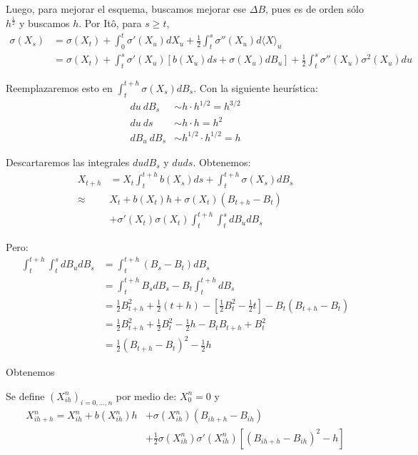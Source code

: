 Luego, para mejorar el esquema, buscamos mejorar ese $\Delta B$, pues es de orden sólo $h^{\frac{1}{2}}$ y 
buscamos $h$. Por It\^{o}, para $s \ge t$, 
\begin{align*}
        \sigma(X_s) 
        &= \sigma(X_t) + \int_{0}^{t} \sigma'(X_u) dX_u + \frac{1}{2} \int_{t}^{s} \sigma''(X_u) 
        d \langle X \rangle_u \\
        &= \sigma(X_t) + \int_{t}^{s} \sigma'(X_u)[b(X_u)ds + \sigma(X_u) dB_u ] 
        + \frac{1}{2} \int_{t}^{s} \sigma''(X_u) \sigma^2(X_u) du
\end{align*}

Reemplazaremos esto en $\int_{t}^{t+h} \sigma (X_s) dB_s$. Con la siguiente heurística:
\begin{align*}
        du~ dB_s   &\sim h \cdot h^{1/2} = h^{3/2} \\ 
        du~ ds     &\sim h \cdot h = h^2 \\
        dB_u~ dB_s &\sim  h^{1/2} \cdot h^{1/2} = h
\end{align*}

Descartaremos las integrales $du dB_s$ y $du ds$. Obtenemos:
\begin{align*}
        X_{t+h} 
        &= X_t \int_{t}^{t+h}b(X_s) ds + \int_{t}^{t+h} \sigma(X_s) dB_s \\
        \approx & X_t + b(X_t)h + \sigma (X_t)(B_{t+h} - B_t)  \\
        &+ \sigma'(X_t) \sigma(X_t) \int_{t}^{t+h}\int_{t}^{s} dB_u dB_s
\end{align*}

 Pero: 
 \begin{align*}
         \int_{t}^{t+h}\int_{t}^{s} dB_u dB_s 
         &= \int_{t}^{t+h} (B_s -B_t) dB_s \\ 
         &= \int_{t}^{t+h} B_s dB_s - B_t \int_{t}^{t+h} dB_s \\ 
         &= \frac{1}{2} B^2_{t+h} + \frac{1}{2}(t+h) 
            - \left[ \frac{1}{2} B^{2}_t - \frac{1}{2} t \right] - B_t (B_{t+h} - B_t) \\ 
         &= \frac{1}{2} B^{2}_{t+h} + \frac{1}{2} B^{2}_t - \frac{1}{2}h - B_t B_{t+h} + B_{t}^2 \\ 
         &= \frac{1}{2} (B_{t+h} - B_t)^2 - \frac{1}{2} h
 \end{align*}

Obtenemos
\begin{algorithm}
\begin{leftbar}
 Se define $(X_{ih}^{n})_{i=0,\ldots,n}$ por
 medio de: $X_0^n = 0$ y
 \begin{align*}
  X_{ih+h}^{n} = X_{ih}^{n} + b(X_{ih}^{n}) h &+ \sigma(X_{ih}^{n}) (B_{ih +h} - B_{ih}) \\
       &+ \frac{1}{2} \sigma (X_{ih}^{n}) \sigma'(X_{ih}^{n}) \left[ (B_{ih +h} - B_{ih})^2 - h\right]
 \end{align*}
\end{leftbar}
\end{algorithm}


